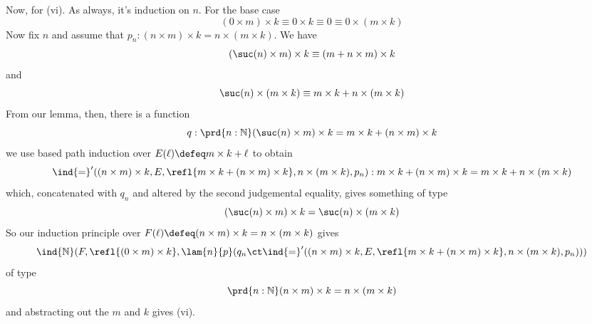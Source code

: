 \begin{enumerate}
Now, for (vi).  As always, it's induction on $n$.  For the base case
\[
  (0 \times m) \times k
  \equiv 0 \times k
  \equiv 0
  \equiv 0 \times (m \times k)
\]
Now fix $n$ and assume that $p_{n} : (n \times m) \times k = n \times (m \times
k)$.  We have
\[
  (\suc(n) \times m) \times k
  \equiv (m + n \times m) \times k
\]
and
\[
  \suc(n) \times (m \times k)
  \equiv
  m \times k + n \times (m \times k)
\]
From our lemma, then, there is a function
\[
  q : \prd{n:\mathbb{N}} (\suc(n) \times m) \times k = m \times k + (n \times
  m) \times k
\]
we use based path induction over $E(\ell) \defeq m \times k + \ell$ to obtain
\[
  \ind{=}'((n\times m)\times k, E, \refl{m\times k + (n \times m) \times k}, n
  \times (m \times k), p_{n})
  :
  m \times k + (n \times m) \times k = m \times k + n \times (m \times k)
\]
which, concatenated with $q_{n}$ and altered by the second judgemental
equality, gives something of type
\[
  (\suc(n) \times m) \times k = \suc(n) \times (m \times k)
\]
So our induction principle over $F(\ell) \defeq (n \times m) \times k = n
\times (m \times k)$ gives
\[
\ind{\mathbb{N}}(F,\refl{(0 \times m) \times k},
\lam{n}{p}(
  q_{n} \ct \ind{=}'((n\times m)\times k, E, \refl{m\times k + (n \times m) \times k}, n
  \times (m \times k), p_{n}) )
)
\]
of type
\[
  \prd{n:\mathbb{N}} (n \times m) \times k = n \times (m \times k)
\]
and abstracting out the $m$ and $k$ gives (vi).


\end{enumerate}
